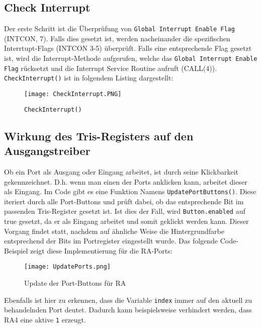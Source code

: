 \documentclass[
10pt, %
a4paper, %
oneside, %
headinclude,footinclude, %
BCOR5mm, %
]{scrartcl}
\begin{document}
			
	\subsection{Check Interrupt}
	\label{sec:checkInt}
		Der erste Schritt ist die Überprüfung von \texttt{Global Interrupt Enable Flag} (INTCON, 7). Falls dies gesetzt ist, werden nacheinander die spezifischen Interrtupt-Flags (INTCON 3-5) überprüft. Falls eine entsprechende Flag gesetzt ist, wird die Interrupt-Methode aufgerufen, welche das \texttt{Global Interrupt Enable Flag} rücksetzt und die Interrupt Service Routine aufruft (CALL(4)).
		\texttt{CheckInterrupt()} ist in folgendem Listing dargestellt:
		
		\begin{figure}[h]
			\begin{center}
				\texttt{[image: CheckInterrupt.PNG]}
				\caption{\texttt{CheckInterrupt()}}
			\end{center}
		\end{figure}
	\newpage
	\subsection{Wirkung des Tris-Registers auf den Ausgangstreiber}
		Ob ein Port als Ausgang oder Eingang arbeitet, ist durch seine Klickbarkeit gekennzeichnet. D.h. wenn man einen der Ports anklicken kann, arbeitet dieser als Eingang. Im Code gibt es eine Funktion Namens \texttt{UpdatePortButtons()}. Diese iteriert durch alle Port-Buttons und prüft dabei, ob das entsprechende Bit im passenden Tris-Register gesetzt ist. Ist dies der Fall, wird \texttt{Button.enabled} auf true gesetzt, da er als Eingang arbeitet und somit geklickt werden kann.
		Dieser Vorgang findet statt, nachdem auf ähnliche Weise die Hintergrundfarbe entsprechend der Bits im Portregister eingestellt wurde. Das folgende Code-Beispiel zeigt diese Implementierung für die RA-Ports:
		
		\begin{figure}[h]
			\begin{center}
				\texttt{[image: UpdatePorts.png]}
				\caption{Update der Port-Buttons für RA}
			\end{center}
		\end{figure}
		
		Ebenfalls ist hier zu erkennen, dass die Variable \texttt{index} immer auf den aktuell zu behandelnden Port deutet. Dadurch kann beispielsweise verhindert werden, dass RA4 eine aktive \texttt{1} erzeugt.
		\newpage
\end{document}
